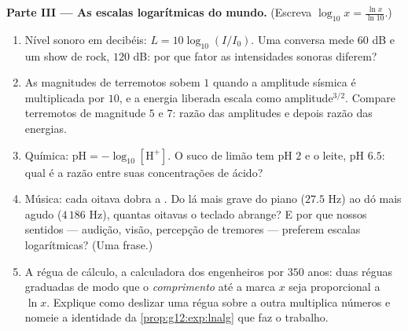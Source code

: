 \begin{problem}
\medskip
\noindent\textbf{Parte III --- As escalas logarítmicas do
mundo.}
(Escreva $\log_{10} x = \frac{\ln x}{\ln 10}$.)
\begin{enumerate}[resume]
  \item Nível sonoro em decibéis: $L = 10 \log_{10}(I/I_0)$. Uma
        conversa mede $60$ dB e um show de rock, $120$ dB: por
        que fator as intensidades sonoras diferem?
  \item As magnitudes de terremotos sobem $1$ quando a amplitude
        sísmica é multiplicada por $10$, e a energia liberada
        escala como amplitude$^{3/2}$. Compare terremotos de
        magnitude $5$ e $7$: razão das amplitudes e depois razão
        das energias.
  \item Química: $\text{pH} = -\log_{10}[\mathrm{H^+}]$. O suco
        de limão tem pH $2$ e o leite, pH $6.5$: qual é a razão
        entre suas concentrações de ácido?
  \item Música: cada oitava dobra a . Do lá mais grave
        do piano ($27.5$ Hz) ao dó mais agudo ($4\,186$ Hz),
        quantas oitavas o teclado abrange? E por que nossos
        sentidos --- audição, visão, percepção de tremores ---
        preferem escalas logarítmicas? (Uma frase.)
  \item A régua de cálculo, a calculadora dos engenheiros por
        $350$ anos: duas réguas graduadas de modo que o
        \emph{comprimento} até a marca $x$ seja proporcional a
        $\ln x$. Explique como deslizar uma régua sobre a outra
        multiplica números e nomeie a identidade da
        \cref{prop:g12:exp:lnalg} que faz o trabalho.
\end{enumerate}


\end{problem}
